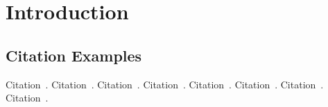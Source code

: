 
\chapter{Introduction}\label{chapter:introduction}

\section{Citation Examples}
Citation~\parencite{latex}.
Citation~\parencite{rfc-9000}.
Citation~\parencite{draft-moqtransport}.
Citation~\parencite{article-quic-usage}.
Citation~\parencite{quic-nic-offload}.
Citation~\parencite{quic-explained}.
Citation~\parencite{facebook-quic-usage}.
Citation~\parencite{google-quic-usage}.





